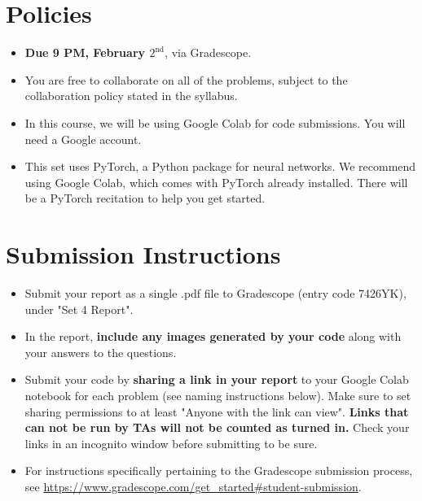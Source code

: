 \newif\ifshowsolutions
\showsolutionstrue







\pagestyle{fancy}




\section*{Policies}
\begin{itemize}
  \item \textbf{Due 9 PM, February $2^\text{nd}$}, via Gradescope.
  \item You are free to collaborate on all of the problems, subject to the collaboration policy stated in the syllabus.
  \item In this course, we will be using Google Colab for code submissions. You will need a Google account.
  \item This set uses PyTorch, a Python package for neural networks. We recommend using Google Colab, which comes with PyTorch already installed. There will be a PyTorch recitation to help you get started.
\end{itemize}

\section*{Submission Instructions}
\begin{itemize}
\item Submit your report as a single .pdf file to Gradescope (entry code 7426YK), under "Set 4 Report". 
	\item In the report, \textbf{include any images generated by your code} along with your answers to the questions.
	\item Submit your code by \textbf{sharing a link in your report} to your Google Colab notebook for each problem (see naming instructions below). Make sure to set sharing permissions to at least "Anyone with the link can view". \textbf{Links that can not be run by TAs will not be counted as turned in.} Check your links in an incognito window before submitting to be sure. 
	\item For instructions specifically pertaining to the Gradescope submission process, see \url{https://www.gradescope.com/get_started#student-submission}.
\end{itemize}

